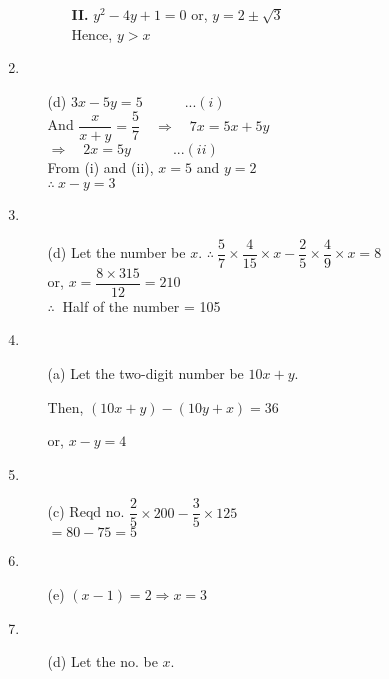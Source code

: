 \begin{multicols}{2}
\begin{enumerate}
\begin{itemize}
\begin{itemize}
    \item[{\bf II.}] $y^2 - 4y + 1 = 0$ or, $y = 2 \pm \sqrt{3}$\\
      Hence, $y > x$
      \end{itemize}
  \end{itemize}
\item
  \begin{itemize}
  \item[(d)] $3x - 5y = 5 \quad\qquad ...(i)$\\
    And $\dfrac{x}{x + y} = \dfrac{5}{7} \quad\Rightarrow\quad 7x = 5x + 5y$\\
    $\Rightarrow\quad 2x = 5y \qquad\quad ...(ii)$\\
    From (i) and (ii), $x = 5$ and $y = 2$\\
    $\therefore~ x - y = 3$
  \end{itemize}
\item
  \begin{itemize}
  \item[(d)] Let the number be $x$.
    $\therefore~ \dfrac{5}{7} \times \dfrac{4}{15} \times x - \dfrac{2}{5} \times \dfrac{4}{9} \times x = 8$\\
    or, $x = \dfrac{8 \times 315}{12} = 210$\\
    $\therefore~$ Half of the number = 105
  \end{itemize}
\item
  \begin{itemize}
  \item[(a)] Let the two-digit number be $10x + y$.

    Then, $(10x + y) - (10y + x) = 36$

    or, $x - y = 4$
  \end{itemize}
\item
\begin{itemize}
  \item[(c)] Reqd no. $\dfrac{2}{5} \times 200 - \dfrac{3}{5} \times 125$\\
  $= 80 - 75 = 5$
\end{itemize}
\item
  \begin{itemize}
  \item[(e)] $(x - 1) = 2 \Rightarrow x = 3$
  \end{itemize}
\item
  \begin{itemize}
  \item[(d)] Let the no. be $x$.


\end{itemize}
\end{enumerate}
\end{multicols}
